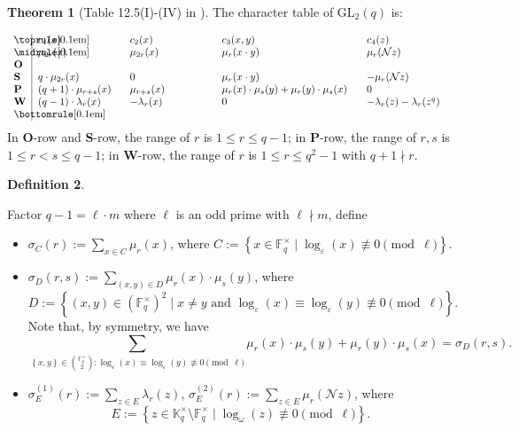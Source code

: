 \documentclass[12pt, reqno]{amsart}
\theoremstyle{definition}
\newtheorem{theorem}{Theorem}[section]
\newtheorem{definition}[theorem]{Definition}
\theoremstyle{remark}
\numberwithin{equation}{section}
\newcommand{\BF}{\mathbb{F}}
\newcommand{\BK}{\mathbb{K}}
\newcommand{\CN}{\mathcal{N}}
\newcommand{\ls}{\leqslant}
\newcommand{\pt}[1]{\left(#1\right)}
\newcommand{\cb}[1]{\left\{#1\right\}}
\newcommand{\GL}{\mathrm{GL}}
\begin{document}
\begin{theorem}[Table 12.5(I)-(IV) in \cite{MR1878556}]
	
	The character table of $\GL_2(q)$ is:
	
	\[\begin{tabular}{p{0.4cm}|p{2.7cm}p{2.7cm}p{4.5cm}p{2.7cm}}
		\toprule[0.1em]
		
		& $c_1(x)$ & $c_2(x)$ & $c_3(x, y)$ & $c_4(z)$ \\
		
		\midrule[0.1em]
		
		\textbf{O} & $\mu_{2r}(x)$ & $\mu_{2r}(x)$ & $\mu_{r}(x\cdot y)$ & $\mu_r(\CN z)$ \\
		
		\textbf{S} & $q\cdot\mu_{2r}(x)$ & $0$ & $\mu_{r}(x\cdot y)$ & $-\mu_r(\CN z)$ \\
		
		\textbf{P} & $(q + 1)\cdot\mu_{r + s}(x)$ & $\mu_{r + s}(x)$ & $\mu_r(x)\cdot\mu_s(y) + \mu_r(y)\cdot\mu_s(x)$ & $0$ \\
		
		\textbf{W} & $(q - 1)\cdot\lambda_{r}(x)$ & $-\lambda_{r}(x)$ & $0$ & $-\lambda_r(z) - \lambda_r(z^q)$ \\
		
		\bottomrule[0.1em]
	\end{tabular}\]
	In \textbf{O}-row and \textbf{S}-row, the range of $r$ is $1 \ls r \ls q - 1$; in \textbf{P}-row, the range of $r, s$ is $1 \ls r < s \ls q - 1$; in \textbf{W}-row, the range of $r$ is $1 \ls r \ls q^2 - 1$ with $q + 1 \nmid r$.
	
\end{theorem}

\begin{definition}\label{derangement_conjugacy_class}
	
	Factor $q - 1 = \ell \cdot m$ where $\ell$ is an odd prime with $\ell \nmid m$, define
	
	\begin{itemize}
		\item $\sigma_C(r) := \sum_{x \in C}\mu_r(x)$, where $C := \cb{x \in \BF_q^\times \;|\; \log_\varepsilon(x) \not\equiv 0 \pmod{\ell}}.$ 
		
		\item $\sigma_D(r, s) := \sum_{\pt{x, y} \in D}\mu_r(x)\cdot\mu_s(y)$, where $$D := \cb{\pt{x, y} \in \pt{\BF_q^\times}^{2} \;|\; x \ne y \text{ and }  \log_\varepsilon(x) \equiv \log_\varepsilon(y) \not\equiv 0\pmod{\ell}}.$$Note that, by symmetry, we have$$\sum_{\cb{x, y} \in \binom{\BF_q^\times}{2}: \log_\varepsilon(x) \equiv \log_\varepsilon(y) \not\equiv 0 \pmod{\ell}}\mu_r(x)\cdot\mu_s(y) + \mu_r(y)\cdot\mu_s(x) = \sigma_D(r, s).$$
		
		\item $\sigma_E^{(1)}(r) := \sum_{z \in E}\lambda_r(z)$, $\sigma_E^{(2)}(r) := \sum_{z \in E}\mu_r\pt{\CN z}$, where $$E := \cb{z \in \BK_q^\times \setminus \BF_q^\times \;|\;  \log_\omega(z) \not\equiv 0\pmod{\ell}}.$$
	\end{itemize}
	
\end{definition}
\end{document}
